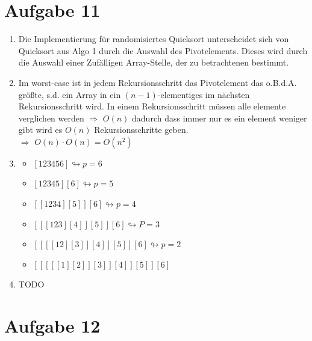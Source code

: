 \documentclass[10pt,a4paper]{article}
\begin{document}
\section*{Aufgabe 11}
    \begin{enumerate}[label={\alph*)}]
        \item
         Die Implementierung für randomisiertes Quicksort
         unterscheidet sich von Quicksort aus Algo 1 durch die
         Auswahl des Pivotelements. Dieses wird durch die Auswahl
         einer Zufälligen Array-Stelle, der zu betrachtenen bestimmt.
         \item
          Im worst-case ist in jedem Rekursionsschritt das Pivotelement
          das o.B.d.A. größte, s.d. ein Array in ein $(n-1)$-elementiges
          im nächsten Rekursionsschritt wird. In einem Rekursionsschritt
          müssen alle elemente verglichen werden $\Rightarrow$ $O(n)$ dadurch dass immer
          nur es ein element weniger gibt wird es $O(n)$ Rekursionsschritte
          geben.
          \\$\Rightarrow$ $O(n)\cdot O(n) = O(n^2)$
        \item
        \begin{itemize}
            \item $[123456] \looparrowright p=6$
            \item $[12345] [6] \looparrowright p=5$
            \item $[[1234] [5]] [6] \looparrowright p=4$
            \item $[[[123] [4]] [5]] [6] \looparrowright P=3$
            \item $[[[[12] [3]] [4]] [5]] [6] \looparrowright p=2$
            \item $[[[[[1] [2]] [3]] [4]] [5]] [6]$
        \end{itemize}
        \item TODO

    \end{enumerate}


\section*{Aufgabe 12}
\end{document}
